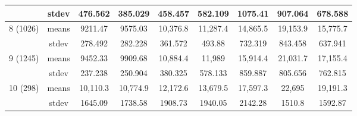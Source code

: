 \documentclass[jmse,article,accept,pdftex,oneauthor]{Definitions/mdpi}
\begin{document}
\begin{table}[H]
\begin{tabular}{ccccccccc}
    & stdev & 476.562 & 385.029 & 458.457 & 582.109 & 1075.41 & 907.064 & 678.588\\
    \midrule
    \multirow{2}{*}{8 (1026)} & means & 9211.47 & 9575.03 & 10,376.8 & 11,287.4 & 14,865.5 & 19,153.9 & 15,775.7 \\
    & stdev & 278.492 & 282.228 & 361.572 & 493.88 & 732.319 & 843.458 & 637.941 \\
    \midrule
    \multirow{2}{*}{9 (1245)} & means & 9452.33 & 9909.68 & 10,884.4 & 11,989 & 15,914.4 & 21,031.7 & 17,155.4 \\
    & stdev & 237.238 & 250.904 & 380.325 & 578.133 & 859.887 & 805.656 & 762.815 \\
    \midrule
    \multirow{2}{*}{10 (298)} & means & 10,110.3 & 10,774.9 & 12,172.6 & 13,679.5 & 17,597.3 & 22,695 & 19,191.3 \\
    & stdev & 1645.09 & 1738.58 &1908.73 & 1940.05 & 2142.28 & 1510.8 & 1592.87 \\
 
\bottomrule
\end{tabular}

  
\end{table}



\vspace{-9pt}
\end{document}
